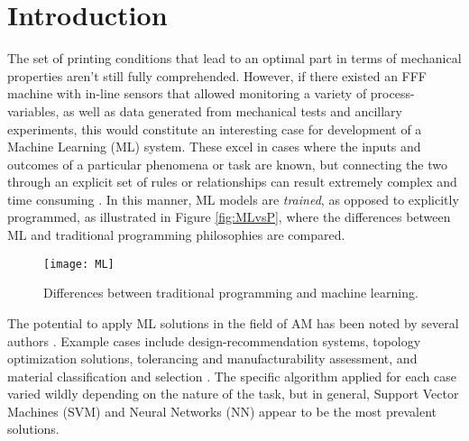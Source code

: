 \documentclass[main.tex]{subfiles}
\begin{document}
\section{Introduction} \label{sec:ml_intr}

The set of printing conditions that lead to an optimal part in terms of mechanical properties aren't still fully comprehended. However, if there existed an FFF machine with in-line sensors that allowed monitoring a variety of process-variables, as well as data generated from mechanical tests and ancillary experiments, this would constitute an interesting case for development of a Machine Learning (ML) system. These excel in cases where the inputs and outcomes of a particular phenomena or task are known, but connecting the two through an explicit set of rules or relationships can result extremely complex and time consuming \cite{Chollet2018}. In this manner, ML models are \emph{trained}, as opposed to explicitly programmed, as illustrated in Figure \ref{fig:MLvsP}, where the differences between ML and traditional programming philosophies are compared. 

\begin{figure}[!htbp]
	\center
	\texttt{[image: ML]}
	\caption{Differences between traditional programming and machine learning. \cite{Chollet2018}} \label{fig:MLvsP_2}
\end{figure}

The potential to apply ML solutions in the field of AM has been noted by several authors \cite{Razvi2019,Meng2020}. Example cases include design-recommendation systems, topology optimization solutions, tolerancing and manufacturability assessment, and material classification and selection \cite{Razvi2019}. The specific algorithm applied for each case varied wildly depending on the nature of the task, but in general, Support Vector Machines (SVM) and Neural Networks (NN) appear to be the most prevalent solutions.
\end{document}
